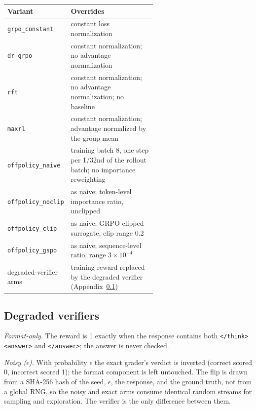 \documentclass{article}
\begin{document}
\begin{minipage}{\linewidth}
\small
\centering
{}
\label{tab:hpvar}
\begin{tabular}{@{}lp{0.60\linewidth}@{}}
\toprule
Variant & Overrides \\
\midrule
\texttt{grpo\_constant} & constant loss normalization \\
\texttt{dr\_grpo} & constant normalization; no advantage normalization \\
\texttt{rft} & constant normalization; no advantage normalization; no baseline \\
\texttt{maxrl} & constant normalization; advantage normalized by the group mean \\
\texttt{offpolicy\_naive} & training batch 8, one step per 1/32nd of the rollout batch; no importance reweighting \\
\texttt{offpolicy\_noclip} & as naive; token-level importance ratio, unclipped \\
\texttt{offpolicy\_clip} & as naive; GRPO clipped surrogate, clip range 0.2 \\
\texttt{offpolicy\_gspo} & as naive; sequence-level ratio, range $3\times10^{-4}$ \\
degraded-verifier arms & training reward replaced by the degraded verifier (Appendix~\ref{app:verifiers}) \\
\bottomrule
\end{tabular}
\end{minipage}

\subsection{Degraded verifiers}
\label{app:verifiers}

\emph{Format-only.} The reward is 1 exactly when the response contains both
\verb|</think> <answer>| and \verb|</answer>|; the answer is never checked.

\emph{Noisy ($\epsilon$).} With probability $\epsilon$ the exact grader's
verdict is inverted (correct scored 0, incorrect scored 1); the format
component is left untouched. The flip is drawn from a SHA-256 hash of the
seed, $\epsilon$, the response, and the ground truth, not from a global RNG,
so the noisy and exact arms consume identical random streams for sampling and
exploration. The verifier is the only difference between them.
\end{document}
